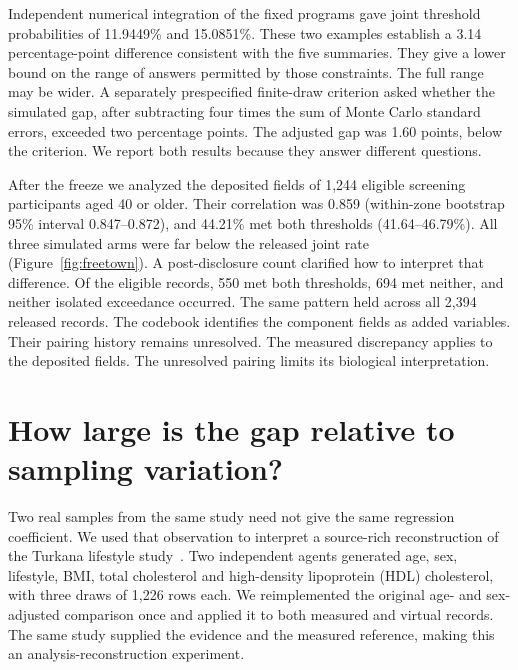 \documentclass[sigconf,anonymous,review]{acmart}
\begin{document}
Independent numerical integration of the fixed programs gave joint threshold probabilities of 11.9449\% and 15.0851\%. These two examples establish a 3.14 percentage-point difference consistent with the five summaries. They give a lower bound on the range of answers permitted by those constraints. The full range may be wider. A separately prespecified finite-draw criterion asked whether the simulated gap, after subtracting four times the sum of Monte Carlo standard errors, exceeded two percentage points. The adjusted gap was 1.60 points, below the criterion. We report both results because they answer different questions.

After the freeze we analyzed the deposited fields of 1,244 eligible screening participants aged 40 or older. Their correlation was 0.859 (within-zone bootstrap 95\% interval 0.847--0.872), and 44.21\% met both thresholds (41.64--46.79\%). All three simulated arms were far below the released joint rate (Figure~\ref{fig:freetown}). A post-disclosure count clarified how to interpret that difference. Of the eligible records, 550 met both thresholds, 694 met neither, and neither isolated exceedance occurred. The same pattern held across all 2,394 released records. The codebook identifies the component fields as added variables. Their pairing history remains unresolved. The measured discrepancy applies to the deposited fields. The unresolved pairing limits its biological interpretation.

\section{How large is the gap relative to sampling variation?}
\label{sec:lifestyle}
Two real samples from the same study need not give the same regression coefficient. We used that observation to interpret a source-rich reconstruction of the Turkana lifestyle study~\cite{lea,leadata}. Two independent agents generated age, sex, lifestyle, BMI, total cholesterol and high-density lipoprotein (HDL) cholesterol, with three draws of 1,226 rows each. We reimplemented the original age- and sex-adjusted comparison once and applied it to both measured and virtual records. The same study supplied the evidence and the measured reference, making this an analysis-reconstruction experiment.
\end{document}
